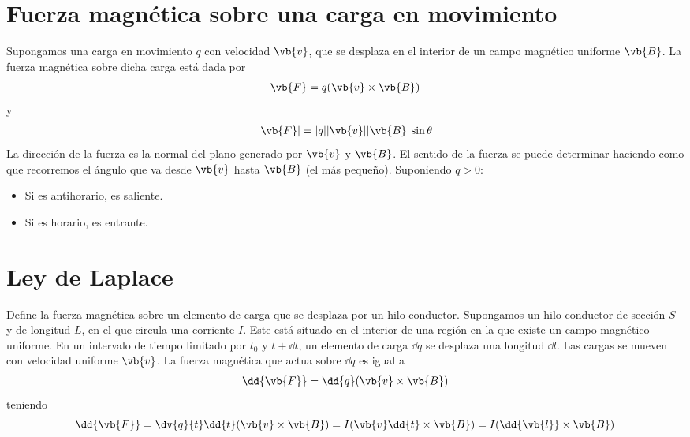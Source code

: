 \documentclass{./FisicaII.tex}
\begin{document}
\section{Fuerza magnética sobre una carga en movimiento}
Supongamos una carga en movimiento \(q\) con velocidad \(\vb{v}\), que se desplaza
en el interior de un campo magnético uniforme \(\vb{B}\). La fuerza magnética sobre
dicha carga está dada por
\begin{equation}
    \begin{split}
        \vb{F} = q (\vb{v} \times \vb{B})
    \end{split}
\end{equation}
y
\begin{equation}
    \begin{split}
        |\vb{F}| = |q| |\vb{v}| |\vb{B}| \sin \theta 
    \end{split}
\end{equation}
La dirección de la fuerza es la normal del plano generado por \(\vb{v}\) y \(\vb{B}\).
El sentido de la fuerza se puede determinar haciendo como que recorremos el ángulo
que va desde \(\vb{v}\) hasta \(\vb{B}\) (el más pequeño). Suponiendo \(q > 0\):
\begin{itemize}
    \item Si es antihorario, es saliente.
    \item Si es horario, es entrante.
\end{itemize}
\section{Ley de Laplace}
Define la fuerza magnética sobre un elemento de carga que se desplaza por un hilo
conductor. Supongamos un hilo conductor de sección \(S\) y de longitud \(L\),
en el que circula una corriente \(I\). Este está situado en el interior de una región
en la que existe un campo magnético uniforme. En un intervalo de tiempo limitado por
\(t_{0}\) y \(t+ \dd{t}\), un elemento de carga \( \dd{q}\) se desplaza una longitud
\( \dd{l}\). Las cargas se mueven con velocidad uniforme \(\vb{v}\). La fuerza
magnética que actua sobre \( \dd{q}\) es igual a
\begin{equation}
    \begin{split}
        \dd{\vb{F}} = \dd{q}(\vb{v} \times \vb{B})
    \end{split}
\end{equation}
teniendo
\[
    \dd{\vb{F}} = \dv{q}{t} \dd{t} (\vb{v} \times \vb{B}) =
    I ( \vb{v} \dd{t} \times \vb{B}) = I ( \dd{\vb{l}} \times \vb{B})
\]
\end{document}
